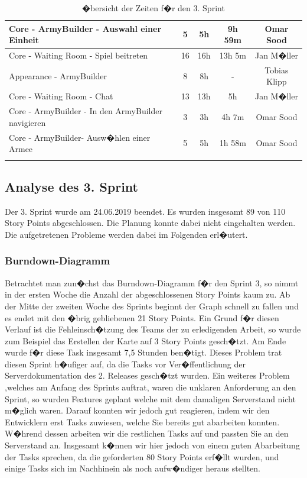 \documentclass[12pt, titlepage]{scrartcl}
\begin{document}
\begin{center}
\begin{longtable}{p{6cm} c c c c }
					Core - ArmyBuilder - Auswahl einer Einheit & 5 & 5h & 9h 59m & Omar Sood\\ \hline
					
					Core - Waiting Room - Spiel beitreten & 16 & 16h & 13h 5m & Jan M�ller\\ \hline
					
					Appearance - ArmyBuilder & 8 & 8h & - & Tobias Klipp \\ \hline
					
					Core - Waiting Room - Chat & 13 & 13h & 5h & Jan M�ller\\ \hline
					
					Core - ArmyBuilder - In den ArmyBuilder navigieren & 3 & 3h & 4h 7m & Omar Sood\\ \hline
					
					Core - ArmyBuilder- Ausw�hlen einer Armee & 5 & 5h & 1h 58m & Omar Sood \\
					\caption{�bersicht der Zeiten f�r den 3. Sprint} \\
				\end{longtable}
		\end{center}
			
		\subsection{Analyse des 3. Sprint}
		Der 3. Sprint wurde am 24.06.2019 beendet. Es wurden insgesamt 89 von 110 Story Points abgeschlossen. Die Planung konnte dabei nicht eingehalten werden. Die aufgetretenen Probleme werden dabei im Folgenden erl�utert.
		
		\subsubsection{Burndown-Diagramm}
		Betrachtet man zun�chst das Burndown-Diagramm f�r den Sprint 3, so nimmt in der ersten Woche die Anzahl der abgeschlossenen Story Points kaum zu. Ab der Mitte der zweiten Woche des Sprints beginnt der Graph schnell zu fallen und es endet mit den �brig gebliebenen 21 Story Points. Ein Grund f�r diesen Verlauf ist die Fehleinsch�tzung des Teams der zu erledigenden Arbeit, so wurde zum Beispiel das Erstellen der Karte auf 3 Story Points gesch�tzt. Am Ende wurde f�r diese Task insgesamt 7,5 Stunden ben�tigt. Dieses Problem trat diesen Sprint h�ufiger auf, da die Tasks vor Ver�ffentlichung der Serverdokumentation des 2. Releases gesch�tzt wurden. Ein weiteres Problem ,welches am Anfang des Sprints auftrat, waren die unklaren Anforderung an den Sprint, so wurden Features geplant welche mit dem damaligen Serverstand nicht m�glich waren. Darauf konnten wir jedoch gut reagieren, indem wir den Entwicklern erst Tasks zuwiesen, welche Sie bereits gut abarbeiten konnten. W�hrend dessen arbeiten wir die restlichen Tasks auf und passten Sie an den Serverstand an. Insgesamt k�nnen wir hier jedoch von einem guten Abarbeitung der Tasks sprechen, da die geforderten 80 Story Points erf�llt wurden, und einige Tasks sich im Nachhinein als noch aufw�ndiger heraus stellten. 
		
\end{document}
